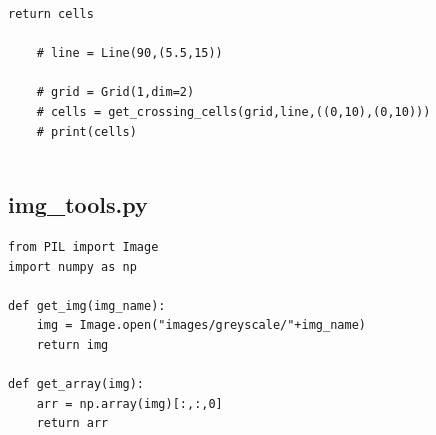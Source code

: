 \documentclass{article}
\begin{document}
\begin{lstlisting}[style=python]
        return cells
    
    # line = Line(90,(5.5,15))
    
    # grid = Grid(1,dim=2)
    # cells = get_crossing_cells(grid,line,((0,10),(0,10)))
    # print(cells)
    
\end{lstlisting}

\subsection{img\_tools.py}
\begin{lstlisting}[style=python]
from PIL import Image
import numpy as np

def get_img(img_name):
    img = Image.open("images/greyscale/"+img_name)
    return img

def get_array(img):
    arr = np.array(img)[:,:,0]
    return arr

\end{lstlisting}
\end{document}
